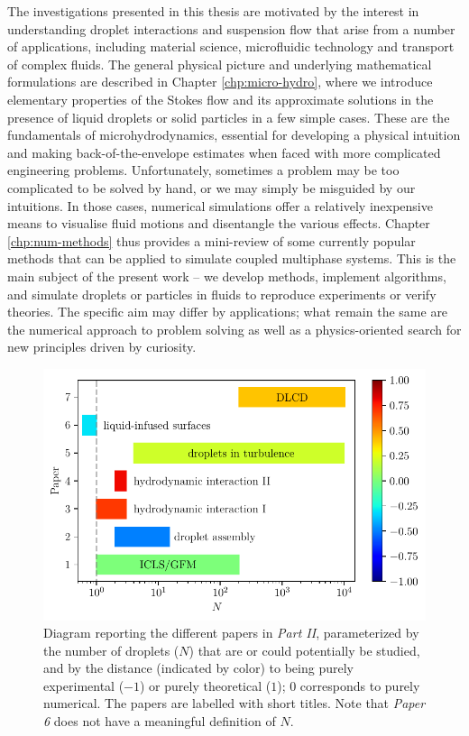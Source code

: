 The investigations presented in this thesis are motivated by the interest in understanding droplet interactions and suspension flow
that arise from a number of applications, including material science, microfluidic technology and transport of complex fluids.
The general physical picture and underlying mathematical formulations are described in Chapter \ref{chp:micro-hydro},
where we introduce elementary properties of the Stokes flow and its approximate solutions in the presence of liquid droplets or solid particles in a few simple cases.
These are the fundamentals of microhydrodynamics,
essential for developing a physical intuition and making back-of-the-envelope estimates when faced with more complicated engineering problems.
Unfortunately, sometimes a problem may be too complicated to be solved by hand, or we may simply be misguided by our intuitions.
In those cases, numerical simulations offer a relatively inexpensive means to visualise fluid motions and disentangle the various effects.
Chapter \ref{chp:num-methods} thus provides a mini-review of some currently popular methods that can be applied to simulate coupled multiphase systems.
This is the main subject of the present work --
we develop methods, implement algorithms, and simulate droplets or particles in fluids to reproduce experiments or verify theories.
The specific aim may differ by applications;
what remain the same are the numerical approach to problem solving as well as a physics-oriented search for new principles driven by curiosity.

\begin{figure}%
  \centering
  \includegraphics[width=0.95\columnwidth]{paper-diagram.pdf}
  \caption{Diagram reporting the different papers in \emph{Part II}, parameterized by the number of droplets ($N$) that are or could potentially be studied,
  and by the distance (indicated by color) to being purely experimental ($-1$) or purely theoretical ($1$); 0 corresponds to purely numerical.
  The papers are labelled with short titles. Note that \emph{Paper 6} does not have a meaningful definition of $N$.}
  \label{fig:p-diagram}
\end{figure}

